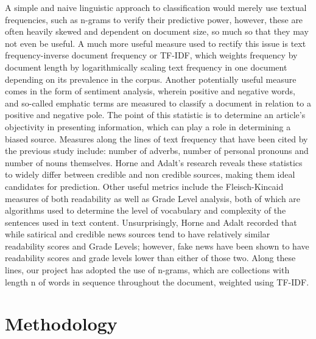 \documentclass{article}
\begin{document}
	A simple and naive linguistic approach to classification would merely use textual frequencies, such as n-grams to verify their predictive power, however, these are often heavily skewed and dependent on document size, so much so that they may not even be useful. A much more useful measure used to rectify this issue is text frequency-inverse document frequency or TF-IDF, which weights frequency by document length by logarithmically scaling text frequency in one document depending on its prevalence in the corpus. Another potentially useful measure comes in the form of sentiment analysis, wherein positive and negative words, and so-called emphatic terms are measured to classify a document in relation to a positive and negative pole. The point of this statistic is to determine an article's objectivity in presenting information, which can play a role in determining a biased source. Measures along the lines of text frequency that have been cited by the previous study include: number of adverbs, number of personal pronouns and number of nouns themselves. Horne and Adalt's research reveals these statistics to widely differ between credible and non credible sources, making them ideal candidates for prediction. Other useful metrics include the Fleisch-Kincaid measures of both readability as well as Grade Level analysis, both of which are algorithms used to determine the level of vocabulary and complexity of the sentences used in text content. Unsurprisingly, Horne and Adalt recorded that while satirical and credible news sources tend to have relatively similar readability scores and Grade Levels; however, fake news have been shown to have readability scores and grade levels lower than either of those two. Along these lines, our project has adopted the use of n-grams, which are collections with length n of words in sequence throughout the document, weighted using TF-IDF. 

\section{Methodology}
\label{gen_inst}
\end{document}
